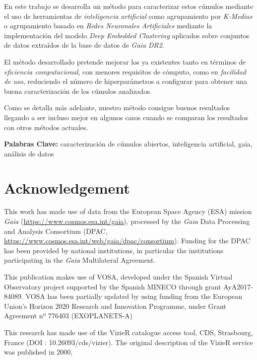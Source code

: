 \documentclass[11pt, a4paper, english]{book}
\begin{document}
En este trabajo se desarrolla un método para caracterizar estos cúmulos mediante el uso de herramientas de \emph{inteligencia artificial}
como agrupamiento por \emph{K-Medias} o agrupamiento basado en \emph{Redes Neuronales Artificiales} mediante la implementación del
modelo \emph{Deep Embedded Clustering} aplicados sobre conjuntos de datos extraídos de la base de datos de \emph{Gaia DR2}.

El método desarrollado pretende mejorar los ya existentes tanto en términos de \emph{eficiencia computacional}, con menores requisitos de cómputo,
como en \emph{facilidad de uso}, reduciendo el número de hiperparámetros a configurar para obtener una buena caracterización de los cúmulos analizados.

Como se detalla más adelante, nuestro método consigue buenos resultados llegando a ser incluso mejor en algunos casos cuando se comparan
los resultados con otros métodos actuales.

\medskip

{\bf Palabras Clave:} caracterización de cúmulos abiertos, inteligencia artificial, gaia, análisis de datos

\chapter{Acknowledgement}

This work has made use of data from the European Space Agency (ESA) mission
{\it Gaia} (\url{https://www.cosmos.esa.int/gaia}), processed by the {\it Gaia}
Data Processing and Analysis Consortium (DPAC,
\url{https://www.cosmos.esa.int/web/gaia/dpac/consortium}). Funding for the DPAC
has been provided by national institutions, in particular the institutions
participating in the {\it Gaia} Multilateral Agreement.

\medskip

This publication makes use of VOSA, developed under the Spanish Virtual Observatory project
supported by the Spanish MINECO through grant AyA2017-84089.
VOSA has been partially updated by using funding from the European Union's Horizon 2020 Research
and Innovation Programme, under Grant Agreement nº 776403 (EXOPLANETS-A)

\medskip

This research has made use of the VizieR catalogue access tool, CDS, Strasbourg, France (DOI : 10.26093/cds/vizier).
The original description of the VizieR service was published in 2000, \cite[A\&AS 143, 23]{ochsenbein2000vizier}
\end{document}
